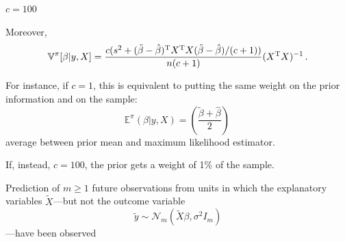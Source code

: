\begin{slide}
{\begin{center}
		$c=100$
\end{center}}

\end{slide}\begin{slide}

\end{slide}\begin{slide}

Moreover,
\small
$$
\mathbb{V}^\pi[\beta|y,X]=\frac{c(s^2+(\tilde\beta-\hat\beta)^{\mathrm{T}} 
X^{\mathrm{T}} X(\tilde\beta-\hat\beta)/(c+1))}{n(c+1)}(X^{\mathrm{T}} X)^{-1}\,.
$$
\normalsize

\pause
{} For instance, if $c=1$, this is equivalent 
to putting the same weight on the prior information 
and on the sample:
$$
\mathbb{E}^\pi(\beta|y,X)=\left(\frac{\tilde\beta+\hat\beta}{2}\right)\,
$$
average between prior mean and maximum likelihood estimator.

\pause
If, instead, $c=100$, the prior gets a weight of 1\% of the sample. 

\end{slide}\begin{slide}

Prediction of $m\ge 1$ future observations from units in which the explanatory variables 
$\tilde X$---but not the outcome variable 
$$
\tilde y \sim \mathcal{N}_m(\tilde X\beta, \sigma^2I_m)
$$
---have been observed 


\end{slide}
